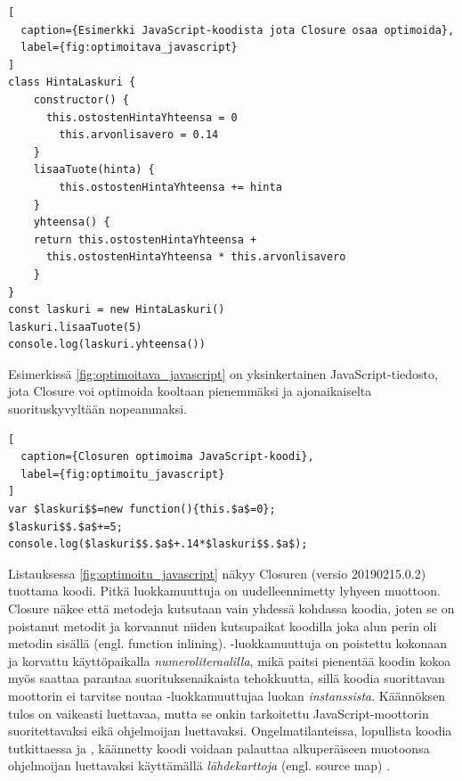 \begin{lstlisting}[
  caption={Esimerkki JavaScript-koodista jota Closure osaa optimoida},
  label={fig:optimoitava_javascript}
]
class HintaLaskuri {
	constructor() {
	  this.ostostenHintaYhteensa = 0
		this.arvonlisavero = 0.14
	}
	lisaaTuote(hinta) {
		this.ostostenHintaYhteensa += hinta
	}
	yhteensa() {
    return this.ostostenHintaYhteensa +
      this.ostostenHintaYhteensa * this.arvonlisavero
	}
}
const laskuri = new HintaLaskuri()
laskuri.lisaaTuote(5)
console.log(laskuri.yhteensa())
\end{lstlisting}
Esimerkissä \ref{fig:optimoitava_javascript} on yksinkertainen
JavaScript-tiedosto, jota Closure voi optimoida kooltaan pienemmäksi
ja ajonaikaiselta suorituskyvyltään nopeammaksi.
\begin{lstlisting}[
  caption={Closuren optimoima JavaScript-koodi},
  label={fig:optimoitu_javascript}
]
var $laskuri$$=new function(){this.$a$=0};
$laskuri$$.$a$+=5;
console.log($laskuri$$.$a$+.14*$laskuri$$.$a$);
\end{lstlisting}
Listauksessa \ref{fig:optimoitu_javascript} näkyy Closuren (versio 20190215.0.2)
tuottama koodi. Pitkä luokkamuuttuja
 on uudelleennimetty lyhyeen muottoon.\newline
Closure näkee että metodeja kutsutaan vain yhdessä kohdassa koodia,
joten se on poistanut metodit ja korvannut niiden kutsupaikat koodilla
joka alun perin oli metodin sisällä (engl. function inlining).
-luokkamuuttuja
on poistettu kokonaan ja korvattu käyttöpaikalla  \textit{numeroliteraalilla},
mikä paitsi pienentää koodin kokoa myös saattaa parantaa suorituksenaikaista
tehokkuutta, sillä koodia suorittavan moottorin ei
tarvitse noutaa -luokkamuuttujaa
luokan \textit{instanssista}. Käännöksen tulos on vaikeasti
luettavaa, mutta se onkin tarkoitettu JavaScript-moottorin suoritettavaksi
eikä ohjelmoijan luettavaksi. Ongelmatilanteissa, lopullista koodia
tutkittaessa ja , käännetty koodi voidaan palauttaa
alkuperäiseen muotoonsa ohjelmoijan luettavaksi käyttämällä \textit{lähdekarttoja}
(engl. source map) \cite{SourceMapMDN, SourceMapsDocsClosure}.


